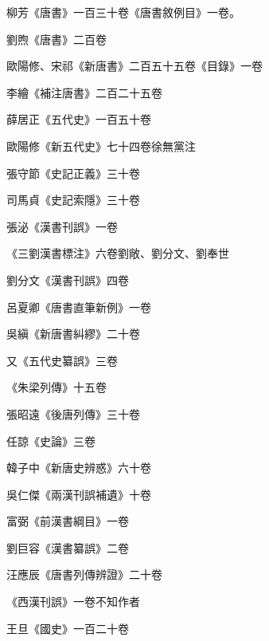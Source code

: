 \begin{pinyinscope}
 柳芳《唐書》一百三十卷《唐書敘例目》一卷。



 劉煦《唐書》二百卷



 歐陽修、宋祁《新唐書》二百五十五卷《目錄》一卷



 李繪《補注唐書》二百二十五卷



 薛居正《五代史》一百五十卷



 歐陽修《新五代史》七十四卷徐無黨注



 張守節《史記正義》三十卷



 司馬貞《史記索隱》三十卷



 張泌《漢書刊誤》一卷



 《三劉漢書標注》六卷劉敞、劉分文、劉奉世



 劉分文《漢書刊誤》四卷



 呂夏卿《唐書直筆新例》一卷



 吳縝《新唐書糾繆》二十卷



 又《五代史纂誤》三卷



 《朱梁列傳》十五卷



 張昭遠《後唐列傳》三十卷



 任諒《史論》三卷



 韓子中《新唐史辨惑》六十卷



 吳仁傑《兩漢刊誤補遺》十卷



 富弼《前漢書綱目》一卷



 劉巨容《漢書纂誤》二卷



 汪應辰《唐書列傳辨證》二十卷



 《西漢刊誤》一卷不知作者



 王旦《國史》一百二十卷




\end{pinyinscope}
